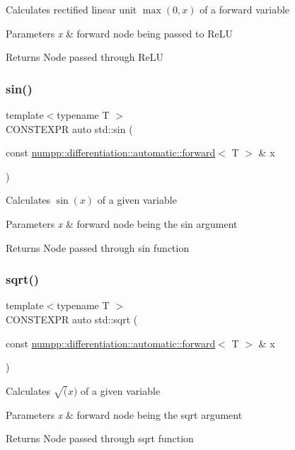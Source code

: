 Calculates rectified linear unit $\max(0,x)$ of a forward variable 
\begin{DoxyParams}{Parameters}
{\em x} & forward node being passed to Re\+LU \\
\hline
\end{DoxyParams}
\begin{DoxyReturn}{Returns}
Node passed through Re\+LU
\end{DoxyReturn}
\mbox{\label{group__numpp__differentiation__forward__automatic_ga6f6f07250087b18ada9ea1f84418f24f}} 
\subsubsection{\texorpdfstring{sin()}{sin()}}
{\footnotesize\ttfamily template$<$typename T $>$ \\
C\+O\+N\+S\+T\+E\+X\+PR auto std\+::sin (\begin{DoxyParamCaption}\item[{const \hyperlink{classnumpp_1_1differentiation_1_1automatic_1_1forward}{numpp\+::differentiation\+::automatic\+::forward}$<$ T $>$ \&}]{x }\end{DoxyParamCaption})}

Calculates $\sin(x)$ of a given variable 
\begin{DoxyParams}{Parameters}
{\em x} & forward node being the sin argument \\
\hline
\end{DoxyParams}
\begin{DoxyReturn}{Returns}
Node passed through sin function
\end{DoxyReturn}
\mbox{\label{group__numpp__differentiation__forward__automatic_ga9c142d0a384bfa6e79bf6f614c98fe1d}} 
\subsubsection{\texorpdfstring{sqrt()}{sqrt()}}
{\footnotesize\ttfamily template$<$typename T $>$ \\
C\+O\+N\+S\+T\+E\+X\+PR auto std\+::sqrt (\begin{DoxyParamCaption}\item[{const \hyperlink{classnumpp_1_1differentiation_1_1automatic_1_1forward}{numpp\+::differentiation\+::automatic\+::forward}$<$ T $>$ \&}]{x }\end{DoxyParamCaption})}

Calculates $\sqrt(x)$ of a given variable 
\begin{DoxyParams}{Parameters}
{\em x} & forward node being the sqrt argument \\
\hline
\end{DoxyParams}
\begin{DoxyReturn}{Returns}
Node passed through sqrt function
\end{DoxyReturn}
